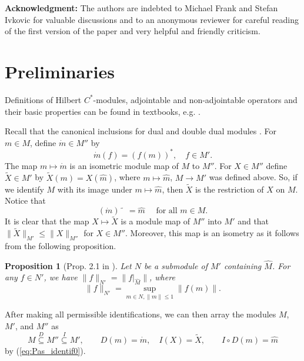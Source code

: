 \documentclass[12pt]{amsart}
\newtheorem{prop}[teo]{Proposition}
\begin{document}
\medskip\noindent
\textbf{Acknowledgment:} The authors are indebted to Michael Frank and Stefan Ivkovic for valuable 
discussions and to an anonymous reviewer for careful reading of the first version of the paper 
and very helpful and friendly criticism.


\section{Preliminaries}
Definitions of Hilbert $C^*$-modules, adjointable and non-adjointable operators and their basic properties can be found in textbooks, e.g. \cite{Pas1,MTBook,Lance,ManuilovTroit2000JMS}.


Recall that the canonical inclusions for dual and double dual modules \cite{Pas2}.
For $m\in M$, define $\dot{m}\in M''$ by 
\begin{equation}\label{11111}
\dot{m}(f)=(f(m))^*, \quad f\in M'.
\end{equation}
The map $m\mapsto \dot{m}$ is an isometric module map of $M$ to $M''$. For $X\in M''$ define $\widetilde{X}\in M'$ by $\widetilde{X}(m)=X(\widehat{m})$, where $m\mapsto \widehat{m}$, $M\to M'$ was defined above. So, if we identify $M$ with its image under $m\mapsto \widehat{m}$, then $\widetilde{X}$ is the restriction of $X$ on $M$. Notice that 
\begin{equation}\label{eq:Pas_identif0}
(\dot{m})\!{\widetilde{\phantom{m}}}=\widehat{m} \quad\mbox{ for all } m\in M.
\end{equation}
It is clear that the map $X\mapsto \widetilde{X}$ 
is a module map of $M''$ into $M'$ and that $\|\widetilde{X}\|_{M'}\le \|X\|_{M''}$ for $X\in M''$. Moreover, this map is an isometry as it follows from the following proposition.
\begin{prop}[Prop. 2.1 in \cite{Pas2}]
Let $N$ be a submodule of $M'$ containing $\widehat{M}$. For any $f\in N'$, we have $\|f\|_{N'}=\|f|_{\widehat{M}}\|$, where
\begin{equation}\label{eq:norm_dual}
\|f\|_{N'}=\sup_{m\in N,\|m\|\leq 1}\|f(m)\|.
\end{equation}
\end{prop}
After making all
permissible identifications, we can then array the modules $M$, $M'$, and $M''$ as
\begin{equation}\label{eq:Pas_identif}
M\overset{D}{\subseteq} M''\overset{I} {\subseteq} M', \qquad D(m)=\dot{m}, \quad I(X)=\widetilde{X}, \qquad I\circ D (m) = \widehat{m}
\end{equation}
by (\ref{eq:Pas_identif0}).
\end{document}

